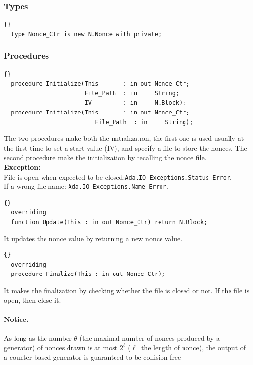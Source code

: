 
\subsubsection*{Types}
\begin{lstlisting}{}
  type Nonce_Ctr is new N.Nonce with private;
\end{lstlisting}


\subsubsection*{Procedures}
\begin{lstlisting}{}
  procedure Initialize(This       : in out Nonce_Ctr;
                       File_Path  : in     String;
                       IV         : in     N.Block);
  procedure Initialize(This       : in out Nonce_Ctr;
  					   	  File_Path  : in     String);
\end{lstlisting}
The two procedures make both the initialization, the first one is used
usually at the first time to set a start value (IV), and specify a
file to store the nonces. The second procedure make the initialization
by recalling the nonce file.\\ 

\noindent\textbf{Exception:}\\  File  is  open  when  expected  to  be
closed:\quad  \texttt{Ada.IO\_Exceptions.Status\_Error}.\\ If  a wrong
file  name: \quad \texttt{Ada.IO\_Exceptions.Name\_Error}.

\hhline
\begin{lstlisting}{}
  overriding
  function Update(This : in out Nonce_Ctr) return N.Block;
\end{lstlisting}
It updates the nonce value by returning a new nonce value.

\hhline
\begin{lstlisting}{}
  overriding
  procedure Finalize(This : in out Nonce_Ctr);
\end{lstlisting}
It makes the finalization by checking whether the file is closed or
not. If the file is open, then close it.

\paragraph{Notice.}
As long as the number $\theta$ (the maximal number of nonces produced
by a generator) of nonces drawn is at most $2^\ell$ ($\ell$: the
length of nonce), the output of a counter-based generator is
guaranteed to be collision-free \cite{DBLP:conf/isw/Zenner09}.\\

